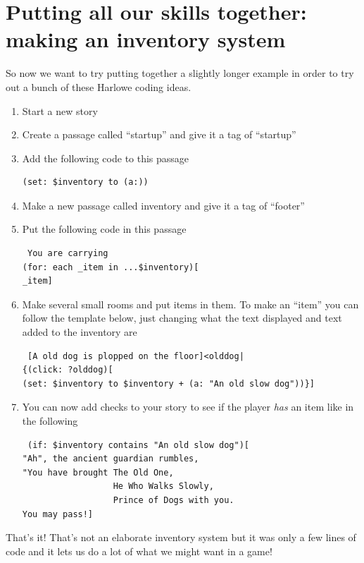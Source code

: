 \documentclass[a5paper,11pt]{article}
\begin{document}
\section{Putting all our skills together: making an inventory system}
So now we want to try putting together a slightly longer example in order to try out a bunch of these Harlowe coding ideas.

\begin{enumerate}
  \item Start a new story
  \item Create a passage called ``startup'' and give it a tag of ``startup''
  \item Add the following code to this passage
\begin{verbatim}
(set: $inventory to (a:))
\end{verbatim}
  \item Make a new passage called inventory and give it a tag of ``footer''
  \item Put the following code in this passage
\begin{verbatim}
 You are carrying
(for: each _item in ...$inventory)[
_item]
\end{verbatim}
  \item Make several small rooms and put items in them. To make an ``item'' you can follow the template below, just changing what the text displayed and text added to the inventory are
\begin{verbatim}
 [A old dog is plopped on the floor]<olddog|
{(click: ?olddog)[
(set: $inventory to $inventory + (a: "An old slow dog"))}]
\end{verbatim}
  \item You can now add checks to your story to see if the player \emph{has} an item like in the following
\begin{verbatim}
 (if: $inventory contains "An old slow dog")[
"Ah", the ancient guardian rumbles, 
"You have brought The Old One, 
                  He Who Walks Slowly, 
                  Prince of Dogs with you. 
You may pass!]
\end{verbatim}
\end{enumerate}
That's it! That's not an elaborate inventory system but it was only a few lines of code and it lets us do a lot of what we might want in a game!
\end{document}
